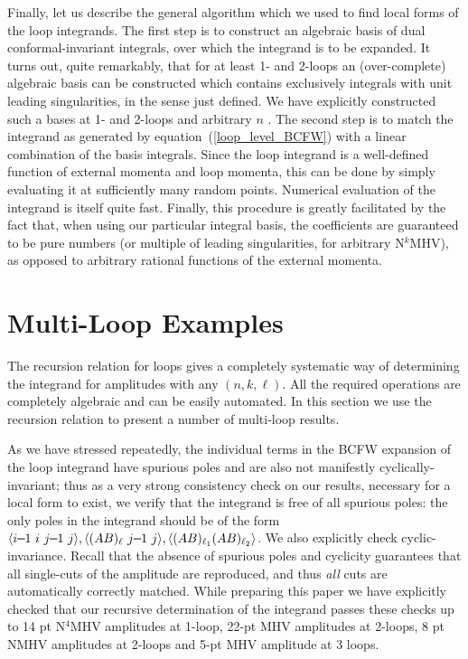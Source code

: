 \documentclass[11pt, reqno]{article}
\newcommand{\smallminus}{{\rm\rule[2.4pt]{6pt}{0.65pt}}}
\newcommand{\ab}[1]{\langle #1\rangle}
\begin{document}
Finally, let us describe the general algorithm which we used to find local forms of the loop integrands.
The first step is to construct an algebraic basis of dual conformal-invariant integrals, over which the integrand is to be expanded.
It turns out, quite remarkably, that for at least 1- and 2-loops an (over-complete) algebraic basis can be
constructed which contains exclusively integrals with unit leading singularities, in the sense just defined. We have explicitly constructed such
a bases at 1- and 2-loops and arbitrary $n$ \cite{InPrep}.
The second step is to match the integrand as generated by equation~(\ref{loop_level_BCFW}) with a linear combination of the basis integrals.
Since the loop integrand is a well-defined function of external momenta and loop momenta,
this can be done by simply evaluating it at sufficiently many random points.  Numerical evaluation of the integrand is itself quite fast.
Finally, this procedure is greatly facilitated by the fact that, when using our particular integral basis,
the coefficients are guaranteed to be pure numbers (or multiple of leading singularities, for arbitrary N$^k$MHV), as opposed to arbitrary rational functions of the external momenta.

\section{Multi-Loop Examples}\label{multiloop_examples}
The recursion relation for loops gives a completely systematic way of determining the integrand for amplitudes with any $(n,k,\ell)$. All the required operations are completely algebraic and can be easily automated. In this section we use the recursion relation to present a number of multi-loop results.

As we have stressed repeatedly, the individual terms in the BCFW expansion of the loop integrand have spurious poles and are also not manifestly cyclically-invariant; thus as a very strong consistency check on our results, necessary for a local form to exist, we verify that the integrand is free of all spurious poles: the only poles in the integrand should be of the form $\ab{i\smallminus1\,\,i\,\,j\smallminus1\,\,j}, \ab{(AB)_{\ell}\,\,j\smallminus1 \,\, j}, \ab{(AB)_{\ell_1}(AB)_{\ell_2}}$. We also explicitly check cyclic-invariance. Recall that the absence of spurious poles and cyclicity guarantees that all single-cuts of the amplitude are reproduced, and thus {\it all} cuts are automatically correctly matched. While preparing this paper we have explicitly checked that our recursive determination of the integrand passes these checks up to 14 pt N$^4$MHV amplitudes at 1-loop, 22-pt MHV amplitudes at 2-loops, 8 pt NMHV amplitudes at 2-loops and 5-pt MHV amplitude at 3 loops.
\end{document}
